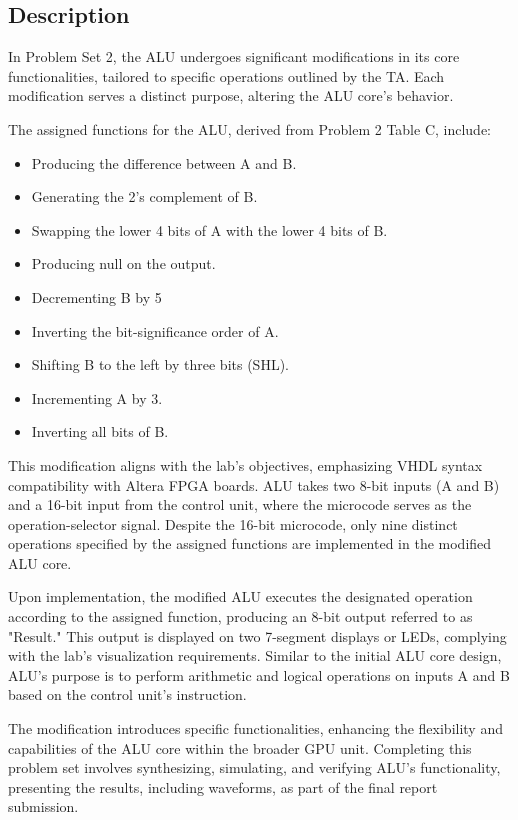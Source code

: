 
\subsection{{Description}}

    {In Problem Set 2, the ALU undergoes significant modifications in its core functionalities, tailored to specific operations outlined by the TA. Each modification serves a distinct purpose, altering the ALU core's behavior.}

    {The assigned functions for the ALU, derived from Problem 2 Table C, include:}

    \begin{itemize}
        \item   {{Producing the difference between A and B.}}
        \item   {{Generating the 2's complement of B.}}
        \item   {{Swapping the lower 4 bits of A with the lower 4 bits of B.}}
        \item   {{Producing null on the output.}}
        \item   {{Decrementing B by 5}}
        \item   {{Inverting the bit-significance order of A.}}
        \item   {{Shifting B to the left by three bits (SHL).}}
        \item   {{Incrementing A by 3.}}
        \item   {{Inverting all bits of B.}}
    \end{itemize}
    
    {This modification aligns with the lab's objectives, emphasizing VHDL syntax compatibility with Altera FPGA boards. ALU takes two 8-bit inputs (A and B) and a 16-bit input from the control unit, where the microcode serves as the operation-selector signal. Despite the 16-bit microcode, only nine distinct operations specified by the assigned functions are implemented in the modified ALU core.}
    
    {Upon implementation, the modified ALU executes the designated operation according to the assigned function, producing an 8-bit output referred to as "Result." This output is displayed on two 7-segment displays or LEDs, complying with the lab's visualization requirements. Similar to the initial ALU core design, ALU's purpose is to perform arithmetic and logical operations on inputs A and B based on the control unit's instruction.}
    
    {The modification introduces specific functionalities, enhancing the flexibility and capabilities of the ALU core within the broader GPU unit. Completing this problem set involves synthesizing, simulating, and verifying ALU's functionality, presenting the results, including waveforms, as part of the final report submission.}

